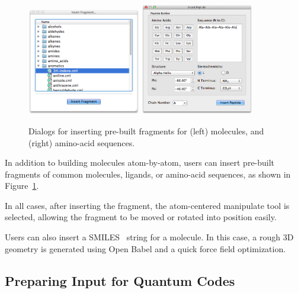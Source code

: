 \documentclass[10pt]{bmc_article}
\newenvironment{bmcformat}{\begin{raggedright}
\baselineskip20pt\sloppy\setboolean{publ}{false}}{\end{raggedright}
\baselineskip20pt\sloppy}
\begin{document}
\begin{bmcformat}
\begin{figure}
  \includegraphics[width=0.44\textwidth]{images/insert-fragment}
  \hspace{0.1cm}
  \includegraphics[width=0.44\textwidth]{images/insert-peptide}
  \caption{Dialogs for inserting pre-built fragments for (left)
    molecules, and (right) amino-acid sequences.}
  \label{f:insertdialogs}
\end{figure}

In addition to building molecules atom-by-atom, users can insert
pre-built fragments of common molecules, ligands, or amino-acid
sequences, as shown in Figure~\ref{f:insertdialogs}.

In all cases, after inserting the fragment, the atom-centered manipulate tool
is selected, allowing the fragment to be moved or rotated into
position easily.

Users can also insert a SMILES~\cite{smiles,opensmiles} string for a molecule. In
this case, a rough 3D geometry is generated using Open Babel and a
quick force field optimization.

\subsection{Preparing Input for Quantum Codes}


\end{bmcformat}
\end{document}
